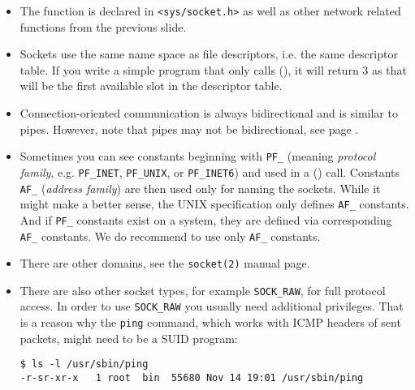 \begin{itemize}
\item The function is declared in \texttt{<sys/socket.h>} as well as other
network related functions from the previous slide.
\item Sockets use the same name space as file descriptors, i.e. the same
descriptor table.  If you write a simple program that only calls
(), it will return 3 as that will be the first available slot in
the descriptor table.
\item Connection-oriented communication is always bidirectional and is similar
to pipes.  However, note that pipes may not be bidirectional, see page
\pageref{TWO_WAY_PIPES}.
\item Sometimes you can see constants beginning with \verb#PF_# (meaning
\emph{protocol family}, e.g. \texttt{PF\_IN\-ET}, \verb#PF_UNIX#, or
\texttt{PF\_IN\-ET6}) and used in a () call. Constants \verb#AF_#
(\emph{address family}) are then used only for naming the sockets.  While it
might make a better sense, the UNIX specification only defines \verb#AF_#
constants.  And if \verb#PF_# constants exist on a system, they are defined via
corresponding \verb#AF_# constants.  We do recommend to use only \verb#AF_#
constants.
\item There are other domains, see the \texttt{socket(2)} manual page.
\item There are also other socket types, for example \texttt{SOCK\_RAW}, for
full protocol access. In order to use \texttt{SOCK\_RAW} you usually need
additional privileges.  That is a reason why the \texttt{ping} command, which
works with ICMP headers of sent packets, might need to be a SUID program:

\begin{verbatim}
$ ls -l /usr/sbin/ping
-r-sr-xr-x   1 root  bin  55680 Nov 14 19:01 /usr/sbin/ping
\end{verbatim}
\end{itemize}



